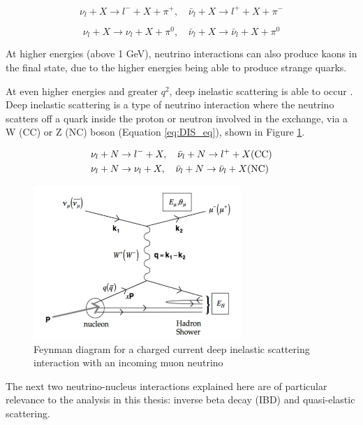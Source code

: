 \begin{equation}
\nu_{l}+X \rightarrow l^{-}+X+\pi^{+}, \quad \bar{\nu}_{l}+X \rightarrow l^{+}+X+\pi^{-}
\label{eq:single_pion_CC}
\end{equation}

\begin{equation}
\nu_{l}+X \rightarrow \nu_{l}+X+\pi^{0}, \quad \bar{\nu}_{l}+X \rightarrow \bar{\nu}_{l}+X+\pi^{0}
\label{eq:single_pion_NC}
\end{equation}

At higher energies (above 1 GeV), neutrino interactions can also produce kaons in the final state, due to the higher energies being able to produce strange quarks. 

At even higher energies and greater $q^2$, deep inelastic scattering is able to occur \cite{kulagin2007neutrino}. Deep inelastic scattering is a type of neutrino interaction where the neutrino scatters off a quark inside the proton or neutron involved in the exchange, via a W (CC) or Z (NC) boson (Equation \ref{eq:DIS_eq}), shown in Figure \ref{fig:CC_DIS}.


\begin{align}
&\nu_{l}+N \rightarrow l^{-}+X, \quad \bar{\nu}_{l}+N \rightarrow l^{+}+X(\mathrm{CC}) \label{eq:DIS_eq}\\
&\nu_{l}+N \rightarrow \nu_{l}+X, \quad \bar{\nu}_{l}+N \rightarrow \bar{\nu}_{l}+X(\mathrm{NC}) \notag
\end{align}


\begin{figure}
    \centering
    \includegraphics[width=0.7\textwidth]{Figures/CC_DIS.png}
    \caption{Feynman diagram for a charged current deep inelastic scattering interaction with an incoming muon neutrino}
    \label{fig:CC_DIS}
\end{figure}

The next two neutrino-nucleus interactions explained here are of particular relevance to the analysis in this thesis: inverse beta decay (IBD) and quasi-elastic scattering. 

